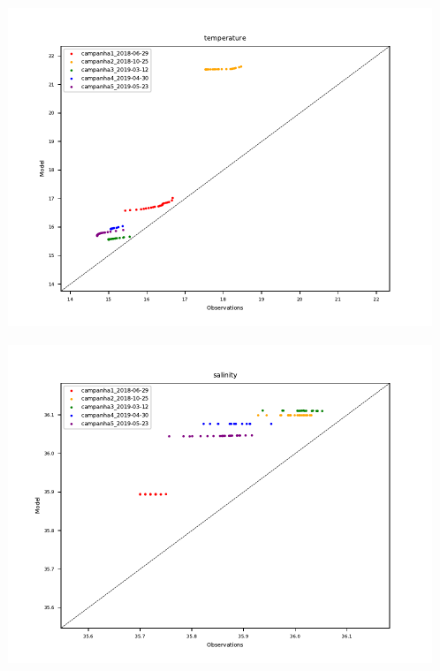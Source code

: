 \documentclass{article}
\begin{document}
\begin{figure}
	\includegraphics[width=\textwidth]{../comparison/temperature.pdf}
\end{figure}

\begin{figure}
	\includegraphics[width=\textwidth]{../comparison/salinity.pdf}
\end{figure}
\end{document}
